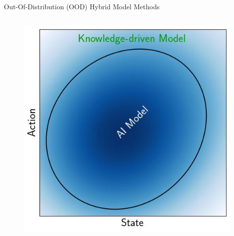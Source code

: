 \documentclass[lecture]{beamer}
\begin{document}
\begin{frame}{\normalsize Out-Of-Distribution (OOD) Hybrid Model Methods}
\begin{columns}
\begin{overlayarea}{\textwidth}{0.5\textheight}
\begin{figure}
{        }
        {%
         \includegraphics[width=\FS\textwidth,clip]{Codes/Epistemic/Hybrid0.jpeg}
        }
        \end{figure}
        \end{overlayarea}
\end{columns}

       \end{frame}
       
       
\end{document}
